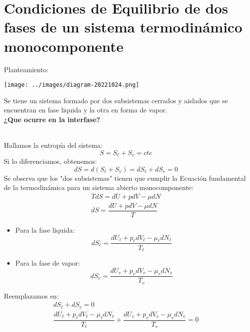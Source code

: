\documentclass[../main]{subfiles}
\begin{document}
\chapter{Condiciones de Equilibrio de dos fases de un sistema termodinámico monocomponente}
\begin{minipage}{0.49\textwidth}
    Planteamiento:
    \begin{center}
        \texttt{[image: ../images/diagram-20221024.png]}
    \end{center}
\end{minipage}
\begin{minipage}{0.49\textwidth}
    Se tiene un sistema formado por dos subsistemas cerrados y aislados que se encuentran en fase liquida y la otra en forma de vapor. \\[0.2cm]
    \textbf{¿Que ocurre en la interfase?}
\end{minipage}
\\[0.2cm]
Hallamos la entropía del sistema:
\begin{equation}
    S=S_{\ell}+S_v=cte
\end{equation}
Si lo diferenciamos, obtenemos:
\begin{equation}
    dS=d(S_{\ell}+S_v)=dS_{\ell}+dS_v=0
\end{equation}
Se observa que los "dos subsistemas" tienen que cumplir la Ecuación fundamental de la termodinámica para un sistema abierto monocomponente:
\begin{align}
    TdS=dU+pdV-\mu dN \\
    dS=\dfrac{dU+pdV-\mu dN}{T}
\end{align}
\begin{itemize}
    \item Para la fase liquida:
          \begin{equation}
              dS_{\ell}=\dfrac{dU_{\ell}+p_{\ell}dV_{\ell}-\mu_{\ell} dN_{\ell}}{T_{\ell}}
          \end{equation}
    \item Para la fase de vapor:
          \begin{equation}
              dS_{v}=\dfrac{dU_{v}+p_{v} dV_{v}-\mu_{v} dN_{v}}{T_{v}}
          \end{equation}
\end{itemize}
Reemplazamos en:
\begin{align}
    dS_{\ell}+dS_v=0 \\
    \dfrac{dU_{\ell}+p_{\ell}dV_{\ell}-\mu_{\ell} dN_{\ell}}{T_{\ell}}+\dfrac{dU_{v}+p_{v} dV_{v}-\mu_{v} dN_{v}}{T_{v}}=0
\end{align}
\end{document}
